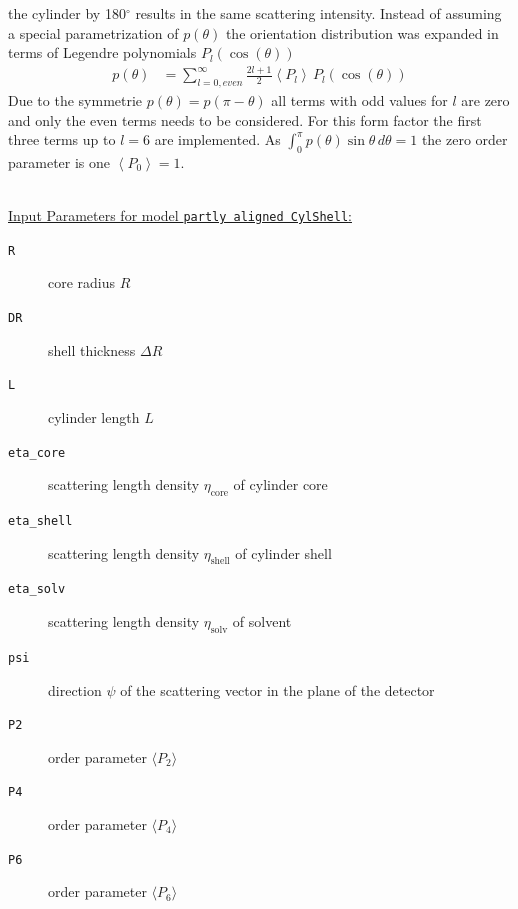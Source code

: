 the cylinder by 180$^\circ$ results in the same scattering intensity. Instead of assuming a
special parametrization of $p(\theta)$ the orientation distribution was expanded in terms of
Legendre polynomials $P_l(\cos(\theta))$
\begin{align}
p(\theta) & = \sum_{l=0,even}^\infty \frac{2l+1}{2} \left\langle P_l\right\rangle\, P_l(\cos(\theta))
\end{align}
Due to the symmetrie $p(\theta)=p(\pi-\theta)$ all terms with odd values for $l$ are zero and only the
even terms needs to be considered. For this form factor the first three terms up to $l=6$ are implemented.
As $\int_0^\pi p(\theta) \sin\theta \, d\theta =1$ the zero order parameter is one $\left\langle P_0 \right\rangle=1$.


\vspace{5mm}

\hspace{1pt}\\
\underline{Input Parameters for model \texttt{partly aligned CylShell}:}\\
\begin{description}
\item[\texttt{R}] core radius $R$
\item[\texttt{DR}] shell thickness $\Delta R$
\item[\texttt{L}] cylinder length $L$
\item[\texttt{eta\_core}] scattering length density $\eta_\text{core}$ of cylinder core
\item[\texttt{eta\_shell}] scattering length density $\eta_\text{shell}$ of cylinder shell
\item[\texttt{eta\_solv}] scattering length density $\eta_\text{solv}$ of solvent
\item[\texttt{psi}] direction $\psi$ of the scattering vector in the plane of the detector
\item[\texttt{P2}] order parameter $\langle P_2\rangle$
\item[\texttt{P4}] order parameter $\langle P_4\rangle$
\item[\texttt{P6}] order parameter $\langle P_6\rangle$
\end{description}

